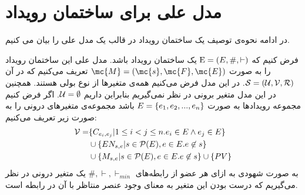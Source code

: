 \section{مدل علی برای ساختمان رویداد}
در ادامه نحوه‌ی توصیف یک ساختمان رویداد در قالب یک مدل علی را بیان می کنیم.

فرض کنیم که
$\mathrm{E} = (E,\#,\vdash)$
یک ساختمان رویداد باشد.
مدل علی این ساختمان رویداد را به صورت
$\mc{M} = (\mc{s},\mc{F},\mc{E})$
تعریف می‌کنیم که در آن
$\mathcal{S} = (\mathcal{U},\mathcal{V},\mathcal{R})$.
در این مدل فرض می‌کنیم همه‌ی متغیر‌ها از نوع بولی هستند.
همچنین در این مدل متغیر برونی در نظر نمی‌گیریم بنابراین داریم
$\mathcal{U} = \emptyset$.
اگر فرض کنیم مجموعه‌ رویدادها به صورت
$E = \{e_1,e_2,...,e_n\}$
باشد مجموعه‌ی متغیر‌های درونی را به صورت زیر تعریف می‌کنیم:
\begin{align*}
    \mathcal{V} = & \{C_{e_i,e_j} |  1 \leq i < j \leq n.
    e_i \in E \wedge e_j \in E\}                              \\
                  & \cup \{EN_{s,e} | s \in \mathcal{P}(E),
    e \in E. e \not \in s \}                                  \\
                  & \cup \{M_{s,e} | s \in \mathcal{P}(E),
        e \in E. e \not \in s \} \cup \{PV\}
\end{align*}
به صورت شهودی به ازای هر عضو از رابطه‌های
$\#,\vdash,\vdash_{min}$
یک متغیر درونی در نظر می‌گیریم که درست بودن این متغیر به معنای وجود عنصر منتاظر با آن در رابطه است.

